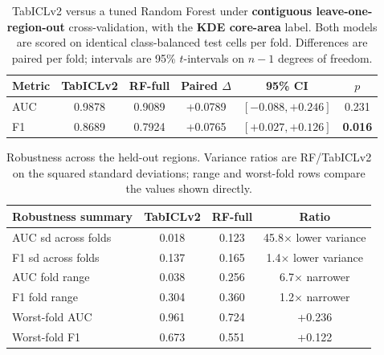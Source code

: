 

\begin{table}[t]
\centering
\caption{TabICLv2 versus a tuned Random Forest under \textbf{contiguous leave-one-region-out} cross-validation, with the \textbf{KDE core-area} label. Both models are scored on identical class-balanced test cells per fold. Differences are paired per fold; intervals are 95\% $t$-intervals on $n-1$ degrees of freedom.}
\label{tab:parity-caretta}
\begin{tabular}{lccccc}
\toprule
Metric & TabICLv2 & RF-full & Paired $\Delta$ & 95\% CI & $p$ \\
\midrule
AUC & 0.9878 & 0.9089 & +0.0789 & $[-0.088, +0.246]$ & 0.231 \\
F1 & 0.8689 & 0.7924 & +0.0765 & $[+0.027, +0.126]$ & \textbf{0.016} \\
\bottomrule
\end{tabular}
\end{table}

\begin{table}[t]
\centering
\caption{Robustness across the held-out regions. Variance ratios are RF/TabICLv2 on the squared standard deviations; range and worst-fold rows compare the values shown directly.}
\label{tab:robustness-caretta}
\begin{tabular}{lccc}
\toprule
Robustness summary & TabICLv2 & RF-full & Ratio \\
\midrule
AUC sd across folds & 0.018 & 0.123 & 45.8$\times$ lower variance \\
F1 sd across folds & 0.137 & 0.165 & 1.4$\times$ lower variance \\
AUC fold range & 0.038 & 0.256 & 6.7$\times$ narrower \\
F1 fold range & 0.304 & 0.360 & 1.2$\times$ narrower \\
Worst-fold AUC & 0.961 & 0.724 & +0.236 \\
Worst-fold F1 & 0.673 & 0.551 & +0.122 \\
\bottomrule
\end{tabular}
\end{table}

